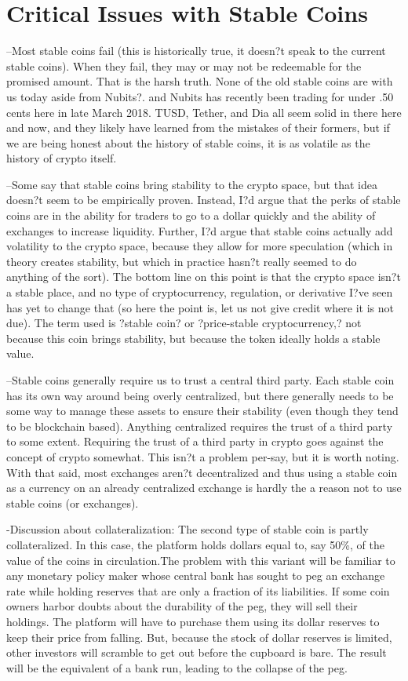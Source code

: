\section{Critical Issues with Stable Coins}

--Most stable coins fail (this is historically true, it doesn?t speak to the current stable coins). When they fail, they may or may not be redeemable for the promised amount. That is the harsh truth. None of the old stable coins are with us today aside from Nubits?. and Nubits has recently been trading for under .50 cents here in late March 2018. TUSD, Tether, and Dia all seem solid in there here and now, and they likely have learned from the mistakes of their formers, but if we are being honest about the history of stable coins, it is as volatile as the history of crypto itself.

--Some say that stable coins bring stability to the crypto space, but that idea doesn?t seem to be empirically proven. Instead, I?d argue that the perks of stable coins are in the ability for traders to go to a dollar quickly and the ability of exchanges to increase liquidity. Further, I?d argue that stable coins actually add volatility to the crypto space, because they allow for more speculation (which in theory creates stability, but which in practice hasn?t really seemed to do anything of the sort). The bottom line on this point is that the crypto space isn?t a stable place, and no type of cryptocurrency, regulation, or derivative I?ve seen has yet to change that (so here the point is, let us not give credit where it is not due). The term used is ?stable coin? or ?price-stable cryptocurrency,? not because this coin brings stability, but because the token ideally holds a stable value.

--Stable coins generally require us to trust a central third party. Each stable coin has its own way around being overly centralized, but there generally needs to be some way to manage these assets to ensure their stability (even though they tend to be blockchain based). Anything centralized requires the trust of a third party to some extent. Requiring the trust of a third party in crypto goes against the concept of crypto somewhat. This isn?t a problem per-say, but it is worth noting. With that said, most exchanges aren?t decentralized and thus using a stable coin as a currency on an already centralized exchange is hardly the a reason not to use stable coins (or exchanges).

-Discussion about collateralization: The second type of stable coin is partly collateralized. In this case, the platform holds dollars equal to, say 50\%, of the value of the coins in circulation.The problem with this variant will be familiar to any monetary policy maker whose central bank has sought to peg an exchange rate while holding reserves that are only a fraction of its liabilities.
If some coin owners harbor doubts about the durability of the peg, they will sell their holdings. The platform will have to purchase them using its dollar reserves to keep their price from falling. But, because the stock of dollar reserves is limited, other investors will scramble to get out before the cupboard is bare. The result will be the equivalent of a bank run, leading to the collapse of the peg.

